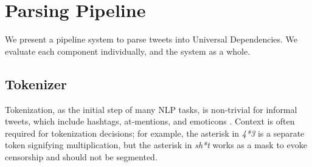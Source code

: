 \documentclass[11pt,a4paper]{article}
\begin{document}
%		



\section{Parsing Pipeline}
\label{sec:parsing}

We present a pipeline system to parse tweets into Universal
Dependencies.  We evaluate each component individually, and the system
as a whole.

\subsection{Tokenizer} \label{sec:tok}
Tokenization, as the initial step of many NLP tasks, is non-trivial for
informal tweets, which include hashtags, at-mentions, and emoticons
\cite{ICWSM101540}.  Context is often required for tokenization
decisions; for example,
the asterisk in {\it 4*3} is a separate token signifying
multiplication, but the asterisk in {\it sh*t}
works as a mask to evoke censorship and should not be segmented.
\end{document}
